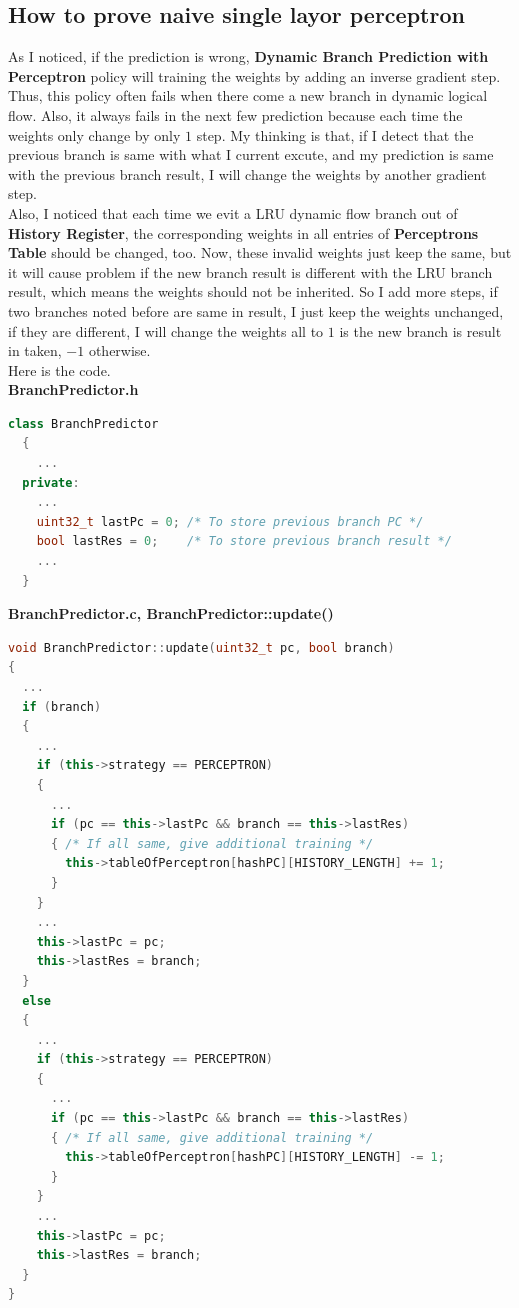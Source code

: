 \documentclass{article}
\begin{document}
\subsection{How to prove naive single layor perceptron}
As I noticed, if the prediction is wrong, \textbf{Dynamic Branch Prediction with Perceptron} policy will training the weights by adding an inverse gradient step. Thus, this policy often fails when there come a new branch in dynamic logical flow. Also, it always fails in the next few prediction because each time the weights only change by only $1$ step. My thinking is that, if I detect that the previous branch is same with what I current excute, and my prediction is same with the previous branch result, I will change the weights by another gradient step.\\
Also, I noticed that each time we evit a LRU dynamic flow branch out of \textbf{History Register}, the corresponding weights in all entries of \textbf{Perceptrons Table} should be changed, too. Now, these invalid weights just keep the same, but it will cause problem if the new branch result is different with the LRU branch result, which means the weights should not be inherited. So I add more steps, if two branches noted before are same in result, I just keep the weights unchanged, if they are different, I will change the weights all to $1$ is the new branch is result in taken, $-1$ otherwise.\\
Here is the code.\\
\textbf{BranchPredictor.h}
\begin{lstlisting}[language=c++]
  class BranchPredictor
  {
    ...
  private:
    ...
    uint32_t lastPc = 0; /* To store previous branch PC */
    bool lastRes = 0;    /* To store previous branch result */
    ...
  }
\end{lstlisting}
\textbf{BranchPredictor.c, BranchPredictor::update()}
\begin{lstlisting}[language=c++]
void BranchPredictor::update(uint32_t pc, bool branch)
{
  ...
  if (branch)
  {
    ...
    if (this->strategy == PERCEPTRON)
    {
      ...
      if (pc == this->lastPc && branch == this->lastRes)
      { /* If all same, give additional training */
        this->tableOfPerceptron[hashPC][HISTORY_LENGTH] += 1;
      }
    }
    ...
    this->lastPc = pc;
    this->lastRes = branch;
  }
  else
  {
    ...
    if (this->strategy == PERCEPTRON)
    {
      ...
      if (pc == this->lastPc && branch == this->lastRes)
      { /* If all same, give additional training */
        this->tableOfPerceptron[hashPC][HISTORY_LENGTH] -= 1;
      }
    }
    ...
    this->lastPc = pc;
    this->lastRes = branch;
  }
}
\end{lstlisting}
\end{document}
